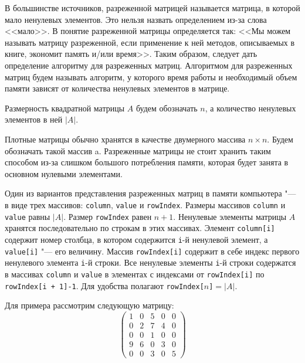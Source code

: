\documentclass[bachelor, och, coursework, times]{SCWorks}
\begin{document}
В большинстве источников, разреженной матрицей называется матрица, в которой мало ненулевых элементов. Это нельзя назвать определением из-за слова <<мало>>. В \cite{matrix_87} понятие разреженной матрицы определяется так: <<Мы можем называть матрицу разреженной, если применение к ней методов, описываемых в книге, экономит память и/или время>>. Таким образом, следует дать определение алгоритму для разреженных матриц. Алгоритмом для разреженных матриц будем называть алгоритм, у которого время работы и необходимый объем памяти зависят от количества ненулевых элементов в матрице.

Размерность квадратной матрицы $A$ будем обозначать $n$, а количество ненулевых элементов в ней $|A|$.

Плотные матрицы обычно хранятся в качестве двумерного массива $n\times n$. Будем обозначать такой массив a. Разреженные матрицы не стоит хранить таким способом из-за слишком большого потребления памяти, которая будет занята в основном нулевыми элементами.

Один из вариантов представления разреженных матриц в памяти компьютера "--- в виде трех массивов: \verb"column", \verb"value" и \verb"rowIndex". Размеры массивов \verb"column" и \verb"value" равны $|A|$. Размер \verb"rowIndex" равен $n+1$. Ненулевые элементы матрицы $A$ хранятся последовательно по строкам в этих массивах. Элемент \verb"column[i]" содержит номер столбца, в котором содержится \verb"i"-й ненулевой элемент, а \verb"value[i]" "--- его величину. Массив \verb"rowIndex[i]" содержит в себе индекс первого ненулевого элемента \verb"i"-й строки. Все ненулевые элементы \verb"i"-й строки содержатся в массивах \verb"column" и \verb"value" в элементах с индексами от \verb"rowIndex[i]" по \verb"rowIndex[i + 1]-1". Для удобства полагают \verb"rowIndex["$n$\verb"]"$=|A|$.

Для примера рассмотрим следующую матрицу:
\[
    \left(
    \begin{matrix}
        1 & 0 & 5 & 0 & 0 \\
        0 & 2 & 7 & 4 & 0 \\
        0 & 0 & 1 & 0 & 0 \\
        9 & 6 & 0 & 3 & 0 \\
        0 & 0 & 3 & 0 & 5
    \end{matrix}
    \right)
\]
\end{document}
